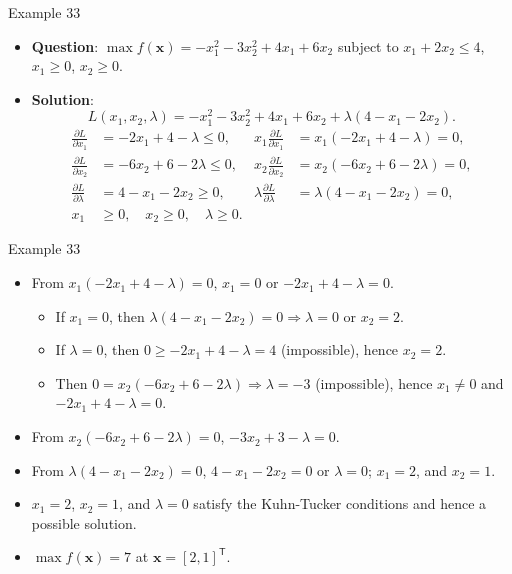 \documentclass[aspectratio=169,hyperref,UTF8,CJK]{beamer}
\newcommand{\trans}{\mathsf{T}}
\newcommand{\vect}[1]{\boldsymbol{#1}}
\begin{document}
\begin{frame}{Example 33}
  \scriptsize
  \begin{itemize}
    \item \textbf{Question}: $\max f(\vect{x})=-x_1^2-3x_2^2+4x_1+6x_2$ subject to $x_1+2x_2\le4$, $x_1\ge0$, $x_2\ge0$.
    \item \textbf{Solution}:
      \begin{equation*}
        L(x_1,x_2,\lambda)=-x_1^2-3x_2^2+4x_1+6x_2+\lambda(4-x_1-2x_2).
      \end{equation*}
      \begin{align*}
        \frac{\partial L}{\partial x_1}&=-2x_1+4-\lambda\le0,
        &x_1\frac{\partial L}{\partial x_1}&=x_1(-2x_1+4-\lambda)=0,\\
        \frac{\partial L}{\partial x_2}&=-6x_2+6-2\lambda\le0,
        &x_2\frac{\partial L}{\partial x_2}&=x_2(-6x_2+6-2\lambda)=0,\\
        \frac{\partial L}{\partial\lambda}&=4-x_1-2x_2\ge0,
        &\lambda\frac{\partial L}{\partial\lambda}&=\lambda(4-x_1-2x_2)=0,\\
        x_1&\ge0,\quad x_2\ge0,\quad\lambda\ge0.
      \end{align*}
  \end{itemize}
\end{frame}

\begin{frame}{Example 33}
  \scriptsize
  \begin{itemize}
    \item From $x_1(-2x_1+4-\lambda)=0$, $x_1=0$ or $-2x_1+4-\lambda=0$.
      \begin{itemize}
        \item If $x_1=0$, then $\lambda(4-x_1-2x_2)=0\Longrightarrow\lambda=0$ or $x_2=2$.
        \item If $\lambda=0$, then $0\ge-2x_1+4-\lambda=4$ (impossible), hence $x_2=2$.
        \item Then $0=x_2(-6x_2+6-2\lambda)\Longrightarrow\lambda=-3$ (impossible), hence $x_1\ne0$ and $-2x_1+4-\lambda=0$.
      \end{itemize}
    \item From $x_2(-6x_2+6-2\lambda)=0$, $-3x_2+3-\lambda=0$.
    \item From $\lambda(4-x_1-2x_2)=0$, $4-x_1-2x_2=0$ or $\lambda=0$; $x_1=2$, and $x_2=1$.
    \item $x_1=2$, $x_2=1$, and $\lambda=0$ satisfy the Kuhn-Tucker conditions and hence a possible solution.
    \item $\max f(\vect{x})=7$ at $\vect{x}=[2,1]^{\trans}$.
  \end{itemize}
\end{frame}
\end{document}
